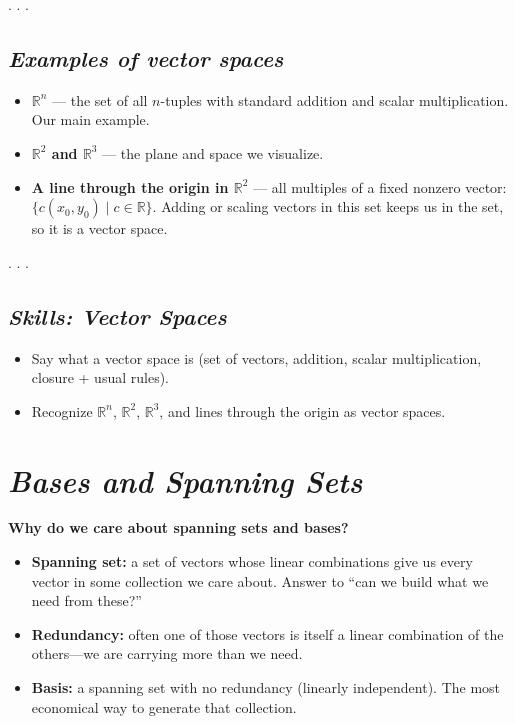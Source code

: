 \documentclass[
  letterpaper,
  DIV=11,
  numbers=noendperiod]{scrartcl}
\providecommand{\tightlist}{%
  \setlength{\itemsep}{0pt}\setlength{\parskip}{0pt}}\usepackage{longtable,booktabs,array}
\begin{document}
. . .

\subsection{\texorpdfstring{\emph{Examples of vector
spaces}}{Examples of vector spaces}}\label{examples-of-vector-spaces}

\begin{itemize}
\item
  \textbf{\(\mathbb{R}^n\)} --- the set of all \(n\)-tuples with
  standard addition and scalar multiplication. Our main example.
\item
  \textbf{\(\mathbb{R}^2\) and \(\mathbb{R}^3\)} --- the plane and space
  we visualize.
\item
  \textbf{A line through the origin in \(\mathbb{R}^2\)} --- all
  multiples of a fixed nonzero vector:
  \(\{c(x_0,y_0) \mid c \in \mathbb{R}\}\). Adding or scaling vectors in
  this set keeps us in the set, so it is a vector space.
\end{itemize}

. . .

\subsection{\texorpdfstring{\emph{Skills: Vector
Spaces}}{Skills: Vector Spaces}}\label{skills-vector-spaces}

\begin{itemize}
\tightlist
\item
  Say what a vector space is (set of vectors, addition, scalar
  multiplication, closure + usual rules).
\item
  Recognize \(\mathbb{R}^n\), \(\mathbb{R}^2\), \(\mathbb{R}^3\), and
  lines through the origin as vector spaces.
\end{itemize}

\section{\texorpdfstring{\emph{Bases and Spanning
Sets}}{Bases and Spanning Sets}}\label{bases-and-spanning-sets}

\textbf{Why do we care about spanning sets and bases?}

\begin{itemize}
\item
  \textbf{Spanning set:} a set of vectors whose linear combinations give
  us every vector in some collection we care about. Answer to ``can we
  build what we need from these?''
\item
  \textbf{Redundancy:} often one of those vectors is itself a linear
  combination of the others---we are carrying more than we need.
\item
  \textbf{Basis:} a spanning set with no redundancy (linearly
  independent). The most economical way to generate that collection.
\end{itemize}
\end{document}

